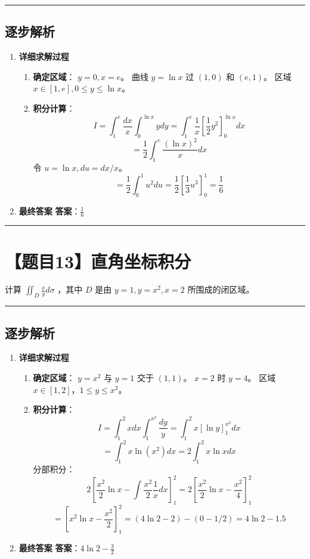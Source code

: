 \documentclass[UTF8]{ctexart}
\newenvironment{redenv}{\color{red}}{}
\newenvironment{detailedanalysis}{%
    \color{red}
    \begin{enumerate}[label=\textbf{第\arabic*步：}, leftmargin=*, align=left, itemsep=1.5ex]
}{%
    \end{enumerate}
}
\newcommand{\problemrule}{\noindent\rule{\textwidth}{1.5pt}\vspace{-0.8em}}
\newcommand{\analysisrule}{\noindent\rule{\textwidth}{0.8pt}\vspace{-0.8em}}
\begin{document}
\begin{redenv}
\analysisrule
\subsection*{逐步解析}

\begin{detailedanalysis}
\item \textbf{详细求解过程}
\begin{enumerate}[label=(\arabic*)]
\item \textbf{确定区域}：
$y=0, x=e$。
曲线 $y=\ln x$ 过 $(1,0)$ 和 $(e, 1)$。
区域 $x \in [1, e], 0 \le y \le \ln x$。
\item \textbf{积分计算}：
$$ I = \int_1^e \frac{dx}{x} \int_0^{\ln x} y dy = \int_1^e \frac{1}{x} [\frac{1}{2}y^2]_0^{\ln x} dx $$
$$ = \frac{1}{2} \int_1^e \frac{(\ln x)^2}{x} dx $$
令 $u=\ln x, du=dx/x$。
$$ = \frac{1}{2} \int_0^1 u^2 du = \frac{1}{2} [\frac{1}{3}u^3]_0^1 = \frac{1}{6} $$
\end{enumerate}

\item \textbf{最终答案}
\textbf{答案}：$ \frac{1}{6} $
\end{detailedanalysis}
\end{redenv}

\problemrule
\section*{【题目13】直角坐标积分}
计算 $ \iint_{D} \frac{x}{y} d\sigma $ ，其中 $D$ 是由 $ y = 1, y = x^{2}, x = 2 $ 所围成的闭区域。

\begin{redenv}
\analysisrule
\subsection*{逐步解析}

\begin{detailedanalysis}
\item \textbf{详细求解过程}
\begin{enumerate}[label=(\arabic*)]
\item \textbf{确定区域}：
$y=x^2$ 与 $y=1$ 交于 $(1,1)$。
$x=2$ 时 $y=4$。
区域 $x \in [1, 2]$，$1 \le y \le x^2$。
\item \textbf{积分计算}：
$$ I = \int_1^2 x dx \int_1^{x^2} \frac{dy}{y} = \int_1^2 x [\ln y]_1^{x^2} dx $$
$$ = \int_1^2 x \ln(x^2) dx = 2 \int_1^2 x \ln x dx $$
分部积分：
$$ 2 [\frac{x^2}{2}\ln x - \int \frac{x^2}{2}\frac{1}{x} dx]_1^2 = 2 [ \frac{x^2}{2}\ln x - \frac{x^2}{4} ]_1^2 $$
$$ = [x^2\ln x - \frac{x^2}{2}]_1^2 = (4\ln 2 - 2) - (0 - 1/2) = 4\ln 2 - 1.5 $$
\end{enumerate}

\item \textbf{最终答案}
\textbf{答案}：$ 4\ln 2 - \frac{3}{2} $
\end{detailedanalysis}
\end{redenv}
\end{document}
